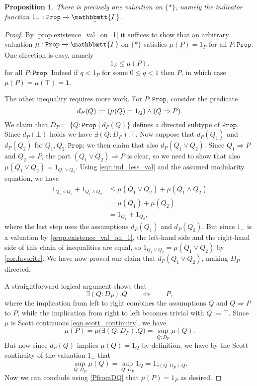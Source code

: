\documentclass[reqno,11pt]{amsproc}
\theoremstyle{plain}
\newtheorem{proposition}[theorem]{Proposition}
\theoremstyle{definition}
\newcommand{\Const}[1]{\mathtt{#1}}
\renewcommand{\to}[1][]{\xrightarrow{#1}}
\newcommand{\ubar}[1]{\underaccent{\bar}{#1}}
\newcommand{\ind}[1]{1_{#1}}			%
\newcommand{\inc}{\ind{-}}			%
\newcommand{\internal}[1]{\raisebox{-.03ex}{$\mathbbmtt{#1}$}}
\newcommand{\hs}{\hspace{1pt}}
\newcommand{\tii}{\ubar{\internal{I\hs\hs}}\!\hs}
\newcommand{\prop}{\Const{Prop}}
\let\originalleft\left
\let\originalright\right
\renewcommand{\left}{\mathopen{}\mathclose\bgroup\originalleft}
\renewcommand{\right}{\aftergroup\egroup\originalright}
\numberwithin{equation}{section}
\begin{document}
\begin{proposition}\label{prop.uniqueness_val_on_1}
	There is precisely one valuation on $\{*\}$, namely the indicator function $\inc : \prop \to \tii$.
\end{proposition}
\begin{proof}
By \cref{prop.existence_val_on_1} it suffices to show that an arbitrary valuation $\mu : \prop \to \tii$ on $\{*\}$ satisfies $\mu(P) = \ind{P}$ for all $P : \prop$. One direction is easy, namely
	\begin{equation}\label{eqn.ind_less_val}
		\ind{P} \le \mu(P).
	\end{equation}
	for all $P:\prop$. Indeed if $q<\ind{P}$ for some $0 \le q<1$ then $P$, in which case $\mu(P)=\mu(\top)=1$. 
	
	The other inequality requires more work. For $P:\prop$, consider the predicate
	\[
		d_P(Q) := \left( \mu(Q) = \ind{Q} \right) \land (Q \Rightarrow P).
	\]
	We claim that $D_P\coloneqq\{Q:\prop\mid d_P(Q)\}$ defines a directed subtype of $\prop$. Since $d_P(\bot)$ holds we have $\exists(Q:D_P).\top$. Now suppose that $d_P(Q_1)$ and $d_P(Q_2)$ for $Q_1, Q_2 : \prop$; we then claim that also $d_P(Q_1 \lor Q_2)$. Since $Q_1 \Rightarrow P$ and $Q_2 \Rightarrow P$, the part $(Q_1 \lor Q_2) \Rightarrow P$ is clear, so we need to show that also $\mu(Q_1 \lor Q_2) = \ind{Q_1 \lor Q_2}$. Using \eqref{eqn.ind_less_val} and the assumed modularity equation, we have
	\begin{align*}
		\ind{Q_1 \lor Q_2} + \ind{Q_1 \land Q_2}	& \le \mu(Q_1 \lor Q_2) + \mu(Q_1 \land Q_2)	\\
								& = \mu(Q_1) + \mu(Q_2) \\
								& = \ind{Q_1} + \ind{Q_2},
	\end{align*}
	where the last step uses the assumptions $d_P(Q_1)$ and $d_P(Q_2)$. But since $\inc$ is a valuation by \cref{prop.existence_val_on_1}, the left-hand side and the right-hand side of this chain of inequalities are equal, so $\ind{Q_1 \lor Q_2} = \mu(Q_1 \lor Q_2)$ by \cref{cor.favorite}. We have now proved our claim that $d_P(Q_1 \lor Q_2)$, making $D_P$ directed.

	A straightforward logical argument shows that
	\begin{equation}
		\label{PfromDQ}
		\exists (Q : D_P). Q \qquad \Longleftrightarrow \qquad P,
	\end{equation}
	where the implication from left to right combines the assumptions $Q$ and $Q \Rightarrow P$ to $P$, while the implication from right to left becomes trivial with $Q := \top$. Since $\mu$ is Scott continuous \eqref{eqn.scott_continuity}, we have
	\[
		\mu(P) = \mu\big( \exists (Q : D_P) . Q \big) = \sup_{Q : D_P} \mu(Q).
	\]
	But now since $d_P(Q)$ implies $\mu(Q) = \ind{Q}$ by definition, we have by the Scott continuity of the valuation $\inc$ that
	\[
		\sup_{Q : D_P} \mu(Q) = \sup_{Q : D_P} \ind{Q} = \ind{\exists(Q:D_P).Q}.
	\]
Now we can conclude using \eqref{PfromDQ} that $\mu(P)=\ind{P}$ as desired.
\end{proof}
\end{document}
